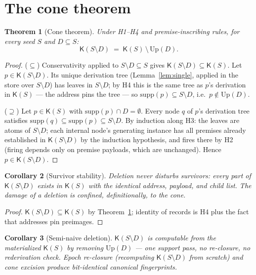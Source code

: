 \documentclass[11pt]{article}
\newtheorem{theorem}{Theorem}
\newtheorem{corollary}[theorem]{Corollary}
\theoremstyle{definition}
\theoremstyle{remark}
\newcommand{\K}{\mathsf{K}}
\newcommand{\Up}{\mathrm{Up}}
\newcommand{\supp}{\mathrm{supp}}
\newcommand{\diffop}{\setminus}
\newcommand{\sub}{\subseteq}
\begin{document}
\section{The cone theorem}\label{sec:cone}

\begin{theorem}[Cone theorem]\label{thm:cone}
Under H1--H4 and premise-inscribing rules, for every seed $S$ and $D \sub S$:
\[ \K(S \diffop D) \;=\; \K(S) \,\setminus\, \Up(D). \]
\end{theorem}

\begin{proof}
($\sub$) Conservativity applied to $S \diffop D \sub S$ gives $\K(S \diffop D) \sub \K(S)$. Let $p \in \K(S \diffop D)$. Its unique derivation tree (Lemma~\ref{lem:single}, applied in the store over $S \diffop D$) has leaves in $S \diffop D$; by H4 this is the same tree as $p$'s derivation in $\K(S)$ --- the address pins the tree --- so $\supp(p) \sub S \diffop D$, i.e.\ $p \notin \Up(D)$.

($\supseteq$) Let $p \in \K(S)$ with $\supp(p) \cap D = \emptyset$. Every node $q$ of $p$'s derivation tree satisfies $\supp(q) \sub \supp(p) \sub S \diffop D$. By induction along H3: the leaves are atoms of $S \diffop D$; each internal node's generating instance has all premises already established in $\K(S \diffop D)$ by the induction hypothesis, and fires there by H2 (firing depends only on premise payloads, which are unchanged). Hence $p \in \K(S \diffop D)$.
\end{proof}

\begin{corollary}[Survivor stability]\label{cor:stability}
Deletion never disturbs survivors: every part of $\K(S \diffop D)$ exists in $\K(S)$ with the identical address, payload, and child list. The damage of a deletion is confined, definitionally, to the cone.
\end{corollary}

\begin{proof}
$\K(S\diffop D) \sub \K(S)$ by Theorem~\ref{thm:cone}; identity of records is H4 plus the fact that addresses pin preimages.
\end{proof}

\begin{corollary}[Semi-naive deletion]\label{cor:locality}
$\K(S \diffop D)$ is computable from the materialized $\K(S)$ by removing $\Up(D)$ --- one support pass, no re-closure, no rederivation check. Epoch re-closure (recomputing $\K(S \diffop D)$ from scratch) and cone excision produce bit-identical canonical fingerprints.
\end{corollary}
\end{document}

